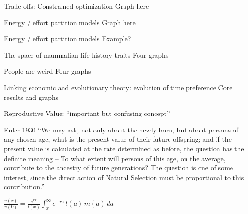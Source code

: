 \documentclass{beamer}
\begin{document}
\begin{frame}{Trade-offs: Constrained optimization}
Graph here\\
\end{frame}

\begin{frame}{Energy / effort partition models}
Graph here\\
\end{frame}

\begin{frame}{Energy / effort partition models}
Example?\\
\end{frame}

\begin{frame}{The space of mammalian life history traits}
Four graphs\\
\end{frame}

\begin{frame}{People are weird}
Four graphs\\
\end{frame}

\begin{frame}{Linking economic and evolutionary theory: evolution of time preference}
Core results and graphs\\
\end{frame}

\begin{frame}{Reproductive Value: ``important but confusing concept''}
\begin{block}{Euler 1930}
``We may ask, not only about the newly born, but about persons of any chosen age, what is the present value of their future offspring; and if the present value is calculated at the rate determined as before, the question has the definite meaning -- To what extent will persons of this age, on the average, contribute to the ancestry of future generations? The question is one of some interest, since the direct action of Natural Selection must be proportional to this contribution.''
\end{block}
\vspace{.5cm}
\pause
$\frac{v(x)}{v(0)} = \frac{e^{rx}}{l(x)} \int_{x}^{\infty} e^{-ra} \, l(a) \, m(a) \, da$
\end{frame}
\end{document}
